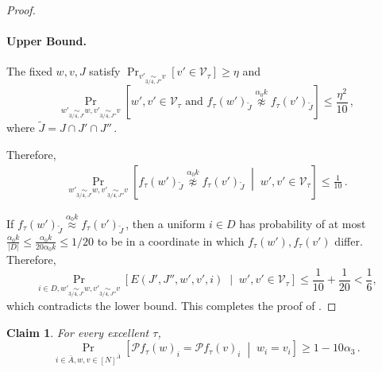 \documentclass[11pt]{article}
\numberwithin{equation}{section}
\newtheorem{claim}[theorem]{Claim}
\theoremstyle{definition}
\theoremstyle{plain}
\newcommand{\Prob}[2][]{\Pr_{{#1}}\left[#2\right]} %
\newcommand{\Brac}[1]{\left[#1\right]} %
\newcommand{\abs}[1]{\lvert#1\rvert} %
\newcommand{\given}{\;\middle\vert\;} %
\newcommand\f{f} %
\newcommand\bh{\mathcal{P}\f_\tau} %
\newcommand\neql[1]{\stackrel{{#1}}{ \approx}} %
\newcommand\neqg[1]{\stackrel{{#1}}{ \not\approx}} %
\newcommand\cons{\mathcal{V}} %
\newcommand\cor[1]{\underset{\scriptscriptstyle#1}{\sim}} %
\begin{document}
\begin{proof}
	\paragraph*{Upper Bound.}
	The fixed $w,v,J$ satisfy 
	$\Prob[v'\cor{3/4,J''} v]{v'\in \cons_\tau}\geq \eta$ and
	\[ \Prob[{w'\cor{3/4,J'}w,v'\cor{3/4,J''} v}] {w',v'\in \cons_\tau \textrm{ and } \f_\tau(w')_{\tilde{J}}\neqg{\alpha_0 k}\f_\tau(v')_{\tilde{J}}  }  \leq \frac{\eta^2}{10} \,,\]%
	where $\tilde{J}=J\cap J'\cap J''$\,.

	Therefore,
	\begin{align*}
	\Prob[{w'\cor{3/4,J'}w,v'\cor{3/4,J''} v}] { \f_\tau(w')_{\tilde{J}}\neqg{\alpha_0 k}\f_\tau(v')_{\tilde{J}}\given w',v'\in \cons_\tau}  \leq \frac{1}{10}\,.%
	\end{align*}
	
	If $\f_\tau(w')_{\tilde{J}}\neql{\alpha_0 k}\f_\tau(v')_{\tilde{J}}$\,, then a uniform $i\in D$ has probability of at most $\frac{\alpha_0 k}{\abs{D}} \leq \frac{\alpha_0 k}{20\alpha_0 k}\leq 
	1/20$ %
	 to be in a coordinate in which $\f_\tau(w'),\f_\tau(v')$ differ.
	Therefore,
	\[ \Prob[{i\in D,w'\cor{3/4,J'}w,v'\cor{3/4,J''} v}]{E(J',J'',w',v',i)\given w',v'\in\cons_\tau} \leq \frac{1}{10} + \frac{1}{20} < \frac{1}{6}, \]
	which contradicts the lower bound. This completes the proof of  .
\end{proof}

\begin{claim}\label{claim:local avg equality}
For every excellent $\tau$,
	\[ \Prob[i\in \bar{A}, w,v\in\Brac{N}^{\bar{A}}]{\bh(w)_i = \bh(v)_i \given w_i=v_i} \geq 1-10\alpha_3\,.\]
\end{claim}
\end{document}
